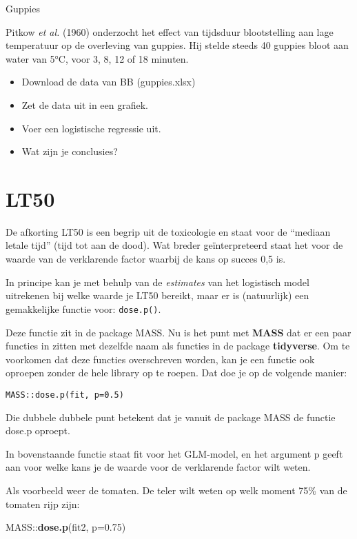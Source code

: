 \documentclass[]{book}
\newenvironment{Shaded}{\begin{snugshade}}{\end{snugshade}}
\newcommand{\KeywordTok}[1]{\textcolor[rgb]{0.13,0.29,0.53}{\textbf{{#1}}}}
\newcommand{\DataTypeTok}[1]{\textcolor[rgb]{0.13,0.29,0.53}{{#1}}}
\newcommand{\FloatTok}[1]{\textcolor[rgb]{0.00,0.00,0.81}{{#1}}}
\newcommand{\NormalTok}[1]{{#1}}
\providecommand{\tightlist}{%
  \setlength{\itemsep}{0pt}\setlength{\parskip}{0pt}}
\theoremstyle{definition}
\theoremstyle{definition}
\theoremstyle{definition}
\theoremstyle{remark}
\let\BeginKnitrBlock\begin \let\EndKnitrBlock\end
\begin{document}
\BeginKnitrBlock{exercise}
\protect\hypertarget{exr:guppies}{}{\label{exr:guppies} }Guppies

Pitkow \emph{et al.} (1960) onderzocht het effect van tijdsduur
blootstelling aan lage temperatuur op de overleving van guppies. Hij
stelde steeds 40 guppies bloot aan water van 5°C, voor 3, 8, 12 of 18
minuten.

\begin{itemize}
\tightlist
\item
  Download de data van BB (guppies.xlsx)
\item
  Zet de data uit in een grafiek.
\item
  Voer een logistische regressie uit.
\item
  Wat zijn je conclusies?
\end{itemize}
\EndKnitrBlock{exercise}

\section{LT50}\label{lt50}

De afkorting LT50 is een begrip uit de toxicologie en staat voor de
``mediaan letale tijd'' (tijd tot aan de dood). Wat breder
geïnterpreteerd staat het voor de waarde van de verklarende factor
waarbij de kans op succes 0,5 is.

In principe kan je met behulp van de \emph{estimates} van het logistisch
model uitrekenen bij welke waarde je LT50 bereikt, maar er is
(natuurlijk) een gemakkelijke functie voor: \texttt{dose.p()}.

Deze functie zit in de package MASS. Nu is het punt met \textbf{MASS}
dat er een paar functies in zitten met dezelfde naam als functies in de
package \textbf{tidyverse}. Om te voorkomen dat deze functies
overschreven worden, kan je een functie ook oproepen zonder de hele
library op te roepen. Dat doe je op de volgende manier:

\texttt{MASS::dose.p(fit,\ p=0.5)}

Die dubbele dubbele punt betekent dat je vanuit de package MASS de
functie dose.p oproept.

In bovenstaande functie staat fit voor het GLM-model, en het argument p
geeft aan voor welke kans je de waarde voor de verklarende factor wilt
weten.

Als voorbeeld weer de tomaten. De teler wilt weten op welk moment 75\%
van de tomaten rijp zijn:

\begin{Shaded}
\begin{Highlighting}[]
\NormalTok{MASS::}\KeywordTok{dose.p}\NormalTok{(fit2, }\DataTypeTok{p=}\FloatTok{0.75}\NormalTok{)}
\end{Highlighting}
\end{Shaded}
\end{document}
